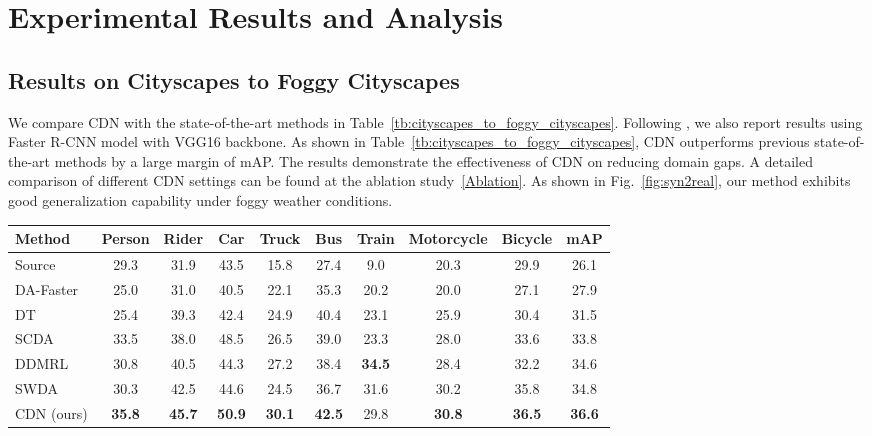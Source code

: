 \documentclass[runningheads]{llncs}
\begin{document}
\section{Experimental Results and Analysis}


\subsection{Results on Cityscapes to Foggy Cityscapes} \label{sec:5-1}
We compare CDN with the state-of-the-art methods in Table~\ref{tb:cityscapes_to_foggy_cityscapes}.
Following \cite{Saito_2019_CVPR,Zhu_2019_CVPR}, we also report results using Faster R-CNN model with VGG16 backbone.
As shown in Table~\ref{tb:cityscapes_to_foggy_cityscapes},
CDN outperforms previous state-of-the-art methods by a large margin of  mAP.
The results demonstrate the effectiveness of CDN on reducing domain gaps.
A detailed comparison of different CDN settings can be found at the ablation study~\ref{Ablation}.
As shown in Fig.~\ref{fig:syn2real}, our method exhibits good generalization capability under foggy weather conditions.

\begin{table*}[]
\centering
\begin{tabular}{l|cccccccc|c}
\hline
Method                              & Person & Rider & Car  & Truck  & Bus  & Train  & Motorcycle & Bicycle  &  mAP \\
\hline
Source                          & 29.3   & 31.9  &43.5  & 15.8   & 27.4  & 9.0   &20.3        & 29.9     & 26.1 \\
\hline
DA-Faster  \cite{chen2018domain}    & 25.0 & 31.0 & 40.5 & 22.1 & 35.3 & 20.2 & 20.0 & 27.1 & 27.9 \\
DT  \cite{Inoue_2018_CVPR}         & 25.4 & 39.3 & 42.4 & 24.9 & 40.4 & 23.1 & 25.9 & 30.4 & 31.5 \\
SCDA \cite{Zhu_2019_CVPR}         & 33.5 & 38.0 & 48.5 & 26.5 & 39.0 & 23.3 & 28.0 & 33.6 & 33.8 \\
DDMRL \cite{kim2019diversify}        & 30.8 & 40.5 & 44.3 & 27.2 & 38.4 & \bf 34.5 & 28.4 & 32.2 & 34.6 \\
SWDA \cite{Saito_2019_CVPR}       & 30.3 & 42.5 & 44.6 & 24.5 & 36.7 & 31.6 & 30.2 & 35.8 & 34.8 \\
\hline
CDN (ours)                      & \bf 35.8 &\bf 45.7 & \bf 50.9  & \bf 30.1  & \bf 42.5 & 29.8 & \bf 30.8 & \bf 36.5 & \bf 36.6 \\
\hline

\end{tabular}
\vspace{4pt}
\caption{Cityscapes to Foggy Cityscapes adaptation.
}
\label{tb:cityscapes_to_foggy_cityscapes}
\end{table*}
\end{document}
